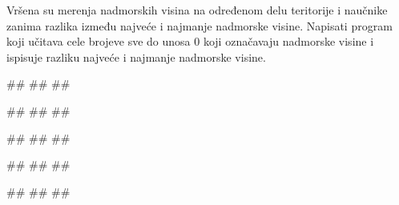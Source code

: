 \begin{Exercise}[label=PET_25] 
Vršena su merenja nadmorskih visina na određenom delu teritorije i
naučnike zanima razlika između najveće i najmanje nadmorske
visine. Napisati program koji učitava cele brojeve sve do unosa $0$
koji označavaju nadmorske visine i ispisuje razliku najveće i najmanje
nadmorske visine.

\begin{miditest}
\begin{upotreba}{1}
#\naslovInt#
##
##
\end{upotreba}
\end{miditest}
\begin{miditest}
\begin{upotreba}{2}
#\naslovInt#
##
##
\end{upotreba}
\end{miditest}

\begin{miditest}
\begin{upotreba}{3}
#\naslovInt#
##
##
\end{upotreba}
\end{miditest}
\begin{miditest}
\begin{upotreba}{4}
#\naslovInt#
##
##
\end{upotreba}
\end{miditest}

\begin{miditest}
\begin{upotreba}{5}
#\naslovInt#
##
##
\end{upotreba}
\end{miditest}

\end{Exercise}
\ifresenja
\begin{Answer}[ref=PET_25]
\end{Answer}
\fi


